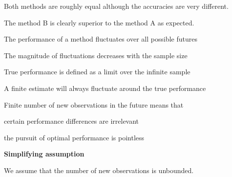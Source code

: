 \documentclass[landscape,footrule]{foils}
\begin{document}




Both methods are roughly equal although the accuracies are very different. 



The method B is clearly superior to the method A as expected. 


\begin{triangles}
\item The performance of a method fluctuates over all possible futures
\item The magnitude of fluctuations decreases with the sample size
\item True performance is defined as a limit over the infinite sample
\item A finite estimate will always fluctuate around the true performance
\end{triangles}
\vspace*{1.5cm}

Finite number of new observations in the future means that
\begin{triangles}
\item certain performance differences are irrelevant
\item the pursuit of optimal performance is pointless
\end{triangles}

\vspace*{2.0cm}
\textbf{Simplifying assumption}
\begin{triangles}
\item We assume that the number of new observations is unbounded.
\end{triangles}








\end{document}

